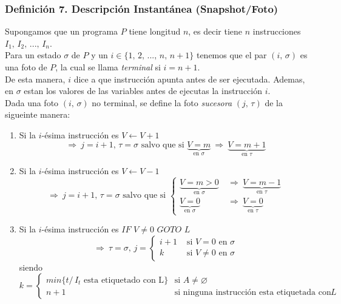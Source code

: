 \documentclass{article}
\newcommand{\comma}{,\,}                                %
\newcommand{\tq}{/\,}                                   %
\newcommand{\Rightarrows}{\: \Rightarrow \:}            %
\newcommand{\tsaltoinc}[2]{$IF$ $#1 \neq 0$ $GOTO$ $#2$ }
\begin{document}
\subsubsection*{Definición 7. Descripción Instantánea (Snapshot/Foto)}
Supongamos que un programa $P$ tiene longitud $n$, es decir tiene $n$ instrucciones $I_1 \comma I_2 \comma ... \comma I_n$.
\\Para un estado $\sigma$ de $P$ y un $i \in \{1 \comma 2 \comma ... \comma n \comma n+1\}$ tenemos que el par $(i \comma \sigma)$ es una foto de $P$, la cual se llama \emph{terminal} si $i = n+1$.
\\De esta manera, $i$ dice a que instrucción  apunta antes de ser ejecutada. Ademas, en $\sigma$ estan los valores de las variables antes de ejecutas la instrucción $i$.
\\Dada una foto $(i \comma \sigma)$ no terminal, se define la foto \emph{sucesora} $(j \comma \tau)$ de la sigueinte manera:
\begin{enumerate}
    \item Si la $i$-ésima instrucción es $V \leftarrow V+1$
    \begin{equation*}
        \Rightarrows j=i+1 \comma \tau = \sigma \text{ salvo que si } \underbrace{V=m}_{\text{en } \sigma} \Rightarrows \underbrace{V = m+1}_{\text{en } \tau}
    \end{equation*}
    \item Si la $i$-ésima instrucción es $V \leftarrow V-1$
    \begin{equation*}
        \Rightarrows j=i+1 \comma \tau = \sigma \text{ salvo que si } \begin{cases}
            \underbrace{V=m > 0}_{\text{en } \sigma} &\Rightarrows \underbrace{V =     m-1}_{\text{en } \tau}\\
            \underbrace{V=0}_{\text{en } \sigma} &\Rightarrows \underbrace{V = 0}_{\text{en } \tau}
        \end{cases}
    \end{equation*}
    \item Si la $i$-ésima instrucción es \tsaltoinc{V}{L}
    \begin{equation*}
        \Rightarrows \tau = \sigma \comma j = \begin{cases}
        i+1 &\text{ si } V = 0 \text{ en } \sigma \\
        k   &\text{ si } V \neq 0 \text{ en } \sigma
        \end{cases}
    \end{equation*}
    siendo $k = \begin{cases}
    min\{t \tq I_t \text{ esta etiquetado con L}\} &\text{ si } A \neq \varnothing\\
    n+1 &\text{ si ninguna instrucción esta etiquetada con } L
    \end{cases}
    $
\end{enumerate}
\end{document}
